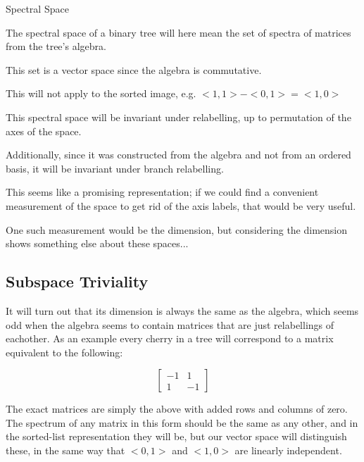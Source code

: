 \documentclass{report}
\begin{document}
\begin{definition}Spectral Space

	The spectral space of a binary tree will here mean the set of spectra of matrices from the tree's algebra.

	This set is a vector space since the algebra is commutative.
\end{definition}


This will not apply to the sorted image, e.g. $<1, 1> - <0, 1> = <1, 0>$

This spectral space will be invariant under relabelling, up to permutation of the axes of the space.

Additionally, since it was constructed from the algebra and not from an ordered basis, it will be invariant under branch relabelling.

This seems like a promising representation; if we could find a convenient measurement of the space to get rid of the axis labels, that would be very useful.

One such measurement would be the dimension, but considering the dimension shows something else about these spaces...


\subsection{Subspace Triviality}

It will turn out that its dimension is always the same as the algebra, which
seems odd when the algebra seems to contain matrices that are just relabellings
of eachother.
As an example every cherry in a tree will correspond to a matrix equivalent to
the following:

\[
	\left[ \begin{matrix}
		-1 & 1\\
		1 & -1
	\end{matrix} \right]
\]

The exact matrices are simply the above with added rows and columns of zero.
The spectrum of any matrix in this form should be the same as any other, and in
the sorted-list representation they will be, but our vector space will
distinguish these, in the same way that $<0, 1>$ and $<1, 0>$ are linearly
independent.
\end{document}
